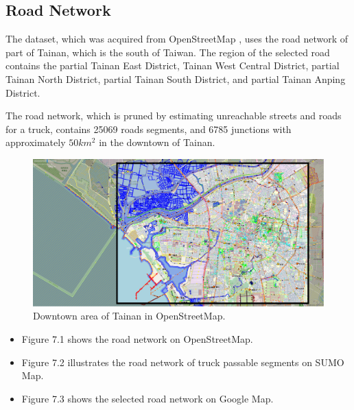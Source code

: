 \documentclass[12pt]{ksthesis}
\begin{document}
\begin{thesis}
{\subsection{Road Network}

The dataset, which was acquired from OpenStreetMap \cite{Haklay2008} , uses the road network of part of Tainan, which is the south of Taiwan. The region of the selected road contains the partial Tainan East District, Tainan West Central District, partial Tainan North District, partial Tainan South District, and partial Tainan Anping District.

The road network, which is pruned by estimating unreachable streets and roads for a truck, contains 25069 roads segments, and 6785 junctions with approximately $50km^{2}$ in the downtown of Tainan.

\begin{figure}[H]
\centering
\includegraphics[width=1.0\textwidth]{./Thesis_figures/F7-1_Openstreetmap.PNG}
\caption{\large Downtown area of Tainan in OpenStreetMap.}
\vspace{0.5cm}
\label{Fig:DowntownArea_in_OpenStreetMap.}
\end{figure}


\begin{itemize}
\item
Figure 7.1 shows the road network on OpenStreetMap.

\item
Figure 7.2 illustrates the road network of truck passable segments on SUMO Map.

\item
Figure 7.3 shows the selected road network on Google Map.

\end{itemize}

}
\end{thesis}
\end{document}
